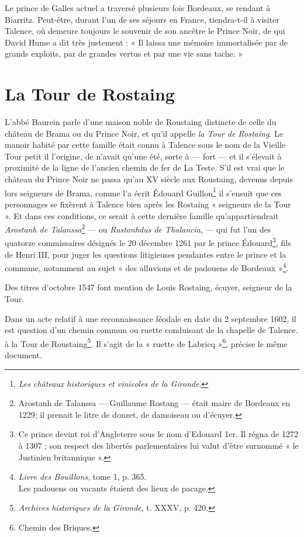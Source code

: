 Le prince de Galles actuel a traversé plusieurs fois Bordeaux, se rendant à Biarritz. Peut-être, durant l'un de ses séjours en France, tiendra-t-il à visiter Talence, où demeure toujours le souvenir de son ancêtre le Prince Noir, de qui David Hume a dit très justement : « Il laissa une mémoire immortalisée par de grands exploits, par de grandes vertus et par une vie sans tache. »

\section{La Tour de Rostaing}

L'abbé Baurein parle d'une maison noble de Roustaing distincte de celle du château de Brama ou du Prince Noir, et qu'il appelle \textit{la Tour de Rostaing}. Le manoir habité par cette famille était connu à Talence sous le nom de la Vieille Tour petit il l'origine, de n'avait qu'une été, sorte à — fort — et il s'élevait à proximité de la ligne de l'ancien chemin de fer de La Teste. S'il est vrai que le château du Prince Noir ne passa qu'au XV\ieme{} siècle aux Roustaing, devenus depuis lors seigneurs de Brama, comme l'a écrit Édouard Guillon\footnote{\textit{Les châteaux historiques et vinicoles de la Gironde}.} il s'ensuit que ces personnages se fixèrent à Talence bien après les Rostaing « seigneurs de la Tour ». Et dans ces conditions, ce serait à cette dernière famille qu'appartiendrait \textit{Arostanh de Talanssa}\footnote{Arostanh de Talanssa — Guillaume Rostang — était maire de Bordeaux en 1229; il prenait le litre de donzet, de damoiseau ou d'écuyer.} — ou \textit{Rustanhdus de Thalancia}, — qui fut l'un des quatorze commissaires désignés le 20 décembre 1261 par le prince Édouard\footnote{Ce prince devint roi d'Angleterre sous le nom d'Edouard 1er. Il régna de 1272 à 1307 ; son respect des libertés parlementaires lui valut d'être surnommé « le Justinien britannique ».}, fils de Henri III, pour juger les questions litigieuses pendantes entre le prince et la commune, notamment au sujet « des alluvions et de padouens de Bordeaux »\footnote{\textit{Livre des Bouillons}, tome 1, p. 365.\\Les padouens ou vacants étaient des lieux de pacage.}.

Des titres d'octobre 1547 font mention de Louis Rostaing, écuyer, seigneur de la Tour.

Dans un acte relatif à une reconnaissance féodale en date du 2 septembre 1602, il est question d'un chemin commun ou ruette conduisant de la chapelle de Talence. à la Tour de Roustaing\footnote{\textit{Archives historiques de la Gironde}, t. XXXV, p. 420.}. Il s'agit de la « ruette de Labricq »\footnote{Chemin des Briques.}, précise le même document.

